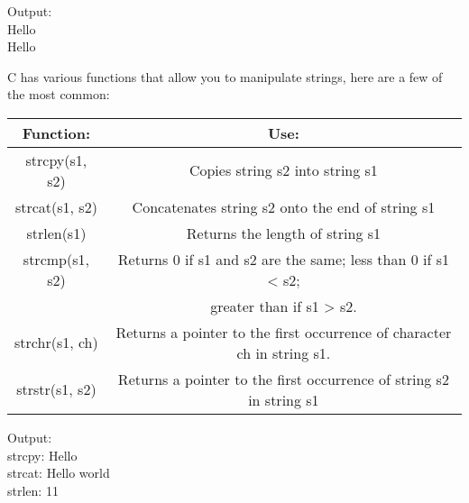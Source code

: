 \documentclass[
	12pt, %
]{fphw}
\begin{document}
\begin{problem}
	
		Output:\\
		Hello\\
		Hello
\end{problem} 


C has various functions that allow you to manipulate strings, here are a few of the most common:
\begin{center}
\begin{tabular}{||c | c ||}
 \hline
 Function: & Use: \\
 \hline\hline
 strcpy(s1, s2) & Copies string s2 into string s1 \\
 \hline
 strcat(s1, s2) & Concatenates string s2 onto the end of string s1 \\
 \hline
 strlen(s1) & Returns the length of string s1 \\
 \hline
 strcmp(s1, s2) & Returns 0 if s1 and s2 are the same; less than 0 if s1 < s2; \\ 
  & greater than if s1 > s2. \\
 \hline
 strchr(s1, ch) & Returns a pointer to the first occurrence of character ch in string s1. \\
 \hline
 strstr(s1, s2) & Returns a pointer to the first occurrence of string s2 in string s1 \\
 \hline 
\end{tabular}
\end{center}

\begin{problem}
	
Output: \\
strcpy: Hello \\
strcat: Hello world \\
strlen: 11
\end{problem} 
\end{document}
